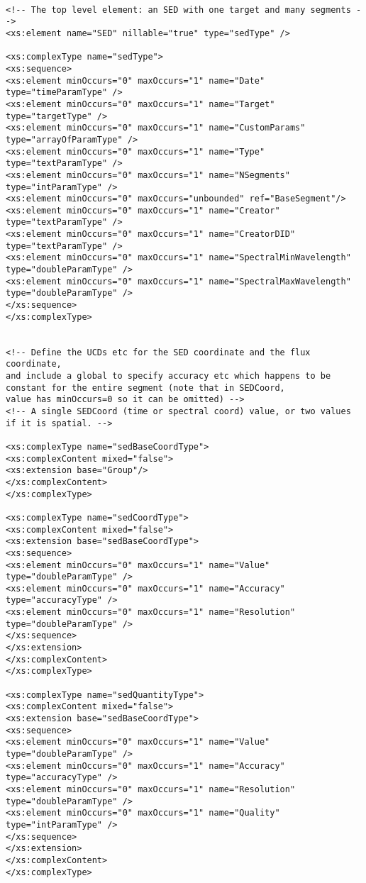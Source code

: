 {\begin{flushleft}
\begin{fmppage}
\begin{verbatim}
\end{verbatim}
\end{fmppage}

\begin{fmppage}
\begin{verbatim}

<!-- The top level element: an SED with one target and many segments -->
<xs:element name="SED" nillable="true" type="sedType" />

<xs:complexType name="sedType">
<xs:sequence>
<xs:element minOccurs="0" maxOccurs="1" name="Date" type="timeParamType" />
<xs:element minOccurs="0" maxOccurs="1" name="Target" type="targetType" />
<xs:element minOccurs="0" maxOccurs="1" name="CustomParams" type="arrayOfParamType" />
<xs:element minOccurs="0" maxOccurs="1" name="Type" type="textParamType" />
<xs:element minOccurs="0" maxOccurs="1" name="NSegments" type="intParamType" />
<xs:element minOccurs="0" maxOccurs="unbounded" ref="BaseSegment"/>
<xs:element minOccurs="0" maxOccurs="1" name="Creator" type="textParamType" />
<xs:element minOccurs="0" maxOccurs="1" name="CreatorDID" type="textParamType" />
<xs:element minOccurs="0" maxOccurs="1" name="SpectralMinWavelength" type="doubleParamType" />
<xs:element minOccurs="0" maxOccurs="1" name="SpectralMaxWavelength" type="doubleParamType" />
</xs:sequence>
</xs:complexType>


<!-- Define the UCDs etc for the SED coordinate and the flux coordinate,
and include a global to specify accuracy etc which happens to be
constant for the entire segment (note that in SEDCoord,
value has minOccurs=0 so it can be omitted) -->
<!-- A single SEDCoord (time or spectral coord) value, or two values if it is spatial. -->

<xs:complexType name="sedBaseCoordType">
<xs:complexContent mixed="false">
<xs:extension base="Group"/>
</xs:complexContent>
</xs:complexType>

<xs:complexType name="sedCoordType">
<xs:complexContent mixed="false">
<xs:extension base="sedBaseCoordType">
<xs:sequence>
<xs:element minOccurs="0" maxOccurs="1" name="Value" type="doubleParamType" />
<xs:element minOccurs="0" maxOccurs="1" name="Accuracy" type="accuracyType" />
<xs:element minOccurs="0" maxOccurs="1" name="Resolution" type="doubleParamType" />
</xs:sequence>
</xs:extension>
</xs:complexContent>
</xs:complexType>

<xs:complexType name="sedQuantityType">
<xs:complexContent mixed="false">
<xs:extension base="sedBaseCoordType">
<xs:sequence>
<xs:element minOccurs="0" maxOccurs="1" name="Value" type="doubleParamType" />
<xs:element minOccurs="0" maxOccurs="1" name="Accuracy" type="accuracyType" />
<xs:element minOccurs="0" maxOccurs="1" name="Resolution" type="doubleParamType" />
<xs:element minOccurs="0" maxOccurs="1" name="Quality" type="intParamType" />
</xs:sequence>
</xs:extension>
</xs:complexContent>
</xs:complexType>



\end{verbatim}
\end{fmppage}
\end{flushleft}}
